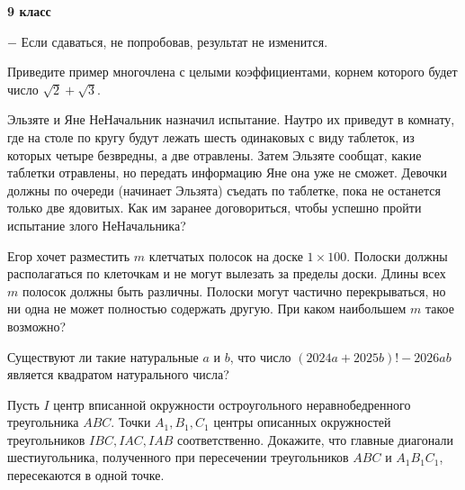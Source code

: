 \hspace{3mm}

\centerline{\bf \huge 9 класс}

\begin{flushright}
        \scriptsize{ $-$ Если сдаваться, не попробовав, результат не изменится.}
\end{flushright}


Приведите пример многочлена с целыми коэффициентами, корнем которого будет число $\sqrt{2} + \sqrt{3}$.


Эльзяте и Яне НеНачальник назначил испытание. Наутро их приведут в комнату, где на столе по кругу будут лежать шесть одинаковых с виду таблеток, из которых четыре безвредны, а две отравлены. Затем Эльзяте сообщат, какие таблетки отравлены, но передать информацию Яне она уже не сможет. Девочки должны по очереди (начинает Эльзята) съедать по таблетке, пока не останется только две ядовитых. Как им заранее договориться, чтобы успешно пройти испытание злого НеНачальника?

Егор хочет разместить $m$ клетчатых полосок на доске $1 \times 100$. Полоски должны располагаться по клеточкам и не могут вылезать за пределы доски. Длины всех $m$ полосок должны быть различны. Полоски могут частично перекрываться, но ни одна не может полностью содержать другую. При каком наибольшем $m$ такое возможно?

Существуют ли такие натуральные $a$ и $b$, что число $(2024a + 2025b)! - 2026ab$ является квадратом натурального числа?

Пусть $I$ центр вписанной окружности остроугольного неравнобедренного треугольника $ABC$. Точки $A_1, B_1, C_1$ центры описанных окружностей треугольников $IBC, IAC, IAB$ соответственно. Докажите, что главные диагонали шестиугольника, полученного при пересечении треугольников $ABC$ и $A_1B_1C_1$, пересекаются в одной точке.